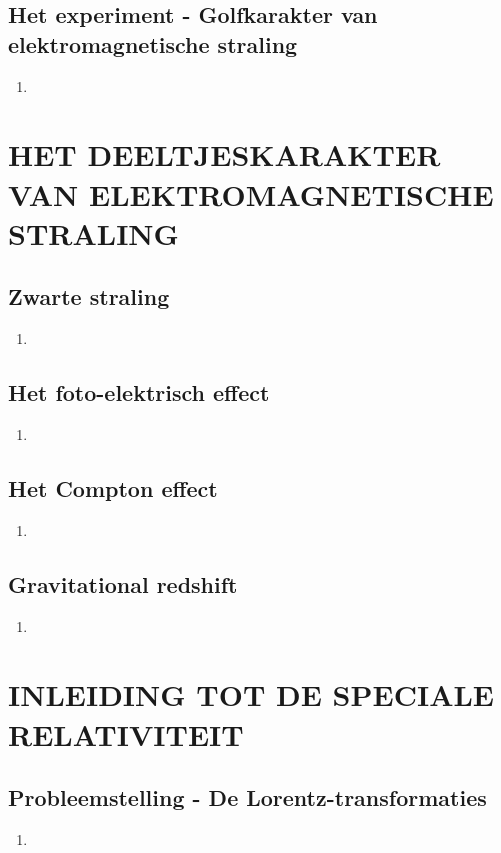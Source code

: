 \documentclass[12pt]{article}
\begin{document}
    \subsection{Het experiment - Golfkarakter van elektromagnetische straling}
    \begin{enumerate}
        \item 
    \end{enumerate}



    \section{HET DEELTJESKARAKTER VAN ELEKTROMAGNETISCHE STRALING}
    \subsection{Zwarte straling}
    \begin{enumerate}
        \item 
    \end{enumerate}
    \subsection{Het foto-elektrisch effect}
    \begin{enumerate}
        \item 
    \end{enumerate}
    \subsection{Het Compton effect}
    \begin{enumerate}
        \item 
    \end{enumerate}
    \subsection{Gravitational redshift}
    \begin{enumerate}
        \item 
    \end{enumerate}



    \section{INLEIDING TOT DE SPECIALE RELATIVITEIT}
    \subsection{Probleemstelling - De Lorentz-transformaties}
    \begin{enumerate}
        \item 
    \end{enumerate}
\end{document}
